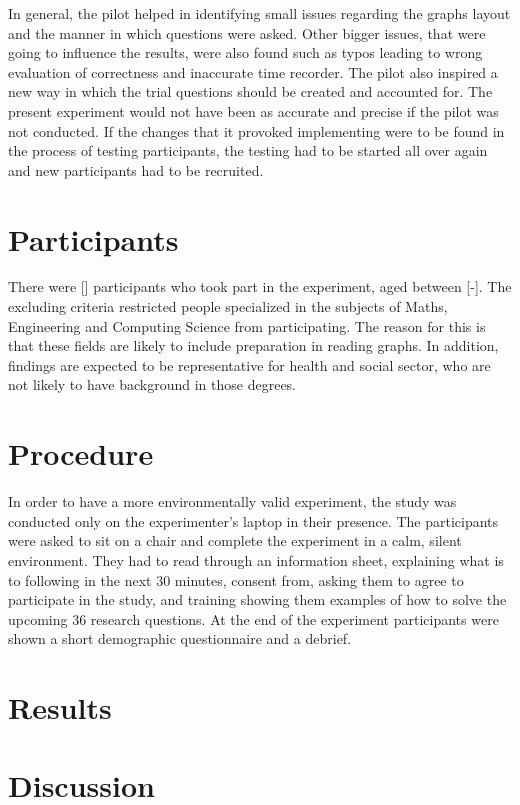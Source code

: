 \documentclass{l4proj}
\begin{document}
In general, the pilot helped in identifying small issues regarding the graphs layout and the manner in which questions were asked. Other bigger issues, that were going to influence the results, were also found such as typos leading to wrong evaluation of correctness and inaccurate time recorder. The pilot also inspired a new way in which the trial questions should be created and accounted for. The present experiment would not have been as accurate and precise if the pilot was not conducted. If the changes that it provoked implementing were to be found in the process of testing participants, the testing had to be started all over again and new participants had to be recruited.

\section{Participants}
There were [] participants who took part in the experiment, aged between [-]. The excluding criteria restricted people specialized in the subjects of Maths, Engineering and Computing Science from participating. The reason for this is that these fields are likely to include preparation in reading graphs. In addition, findings are expected to be representative for health and social sector, who are not likely to have background in those degrees.

\section{Procedure}

In order to have a more environmentally valid experiment, the study was conducted only on the experimenter's laptop in their presence. The participants were asked to sit on a chair and complete the experiment in a calm, silent environment. They had to read through an information sheet, explaining what is to following in the next 30 minutes, consent from, asking them to agree to participate in the study, and training showing them examples of how to solve the upcoming 36 research questions. At the end of the experiment participants were shown a short demographic questionnaire and a debrief.




\section{Results}

\section{Discussion}
\end{document}
